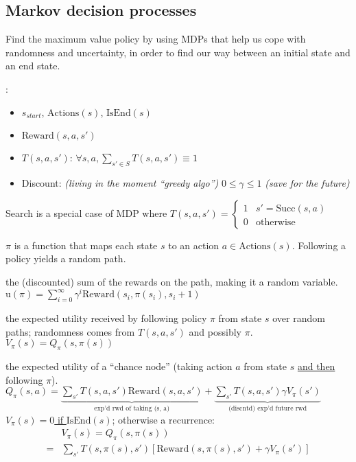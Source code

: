 \subsection{Markov decision processes}

Find the maximum value policy by using MDPs that help us cope with randomness
and uncertainty, in order to find our way between an initial state and an end
state.

:
\begin{itemize}
    \item $s_{start}$, $\text{Actions}(s)$, $\text{IsEnd}(s)$
    \item $\text{Reward}(s,a,s')$
    \item $T(s,a,s')$: $\forall s,a, \sum_{s'\in S} T(s,a,s') \equiv 1$
    \item Discount: \emph{(living in the moment ``greedy algo'')} $0 \le \gamma \le 1$ \emph{(save for the future)}
\end{itemize}
Search is a special case of MDP where $T(s,a,s') = \begin{cases}
    1 & s' = \text{Succ}(s,a) \\
    0 & \text{otherwise}
\end{cases}$

 $\pi$ is a function that maps each state $s$ to an action $a \in
\text{Actions}(s)$. Following a policy yields a random path.

 the (discounted) sum of the rewards on the
path, making it a random variable.
$\text{u}(\pi) = \sum_{i=0}^{\infty} \gamma^i \text{Reward}(s_i, \pi(s_i), s_i + 1)$

 the expected utility received by
following policy $\pi$ from state $s$ over random paths; randomness comes from
$T(s,a,s')$ and possibly $\pi$. $V_\pi(s) = Q_\pi(s,\pi(s))$

 the expected utility of a ``chance node'' (taking action $a$ from
state $s$ \underline{and then} following $\pi$).
$Q_\pi(s,a)
= \underbrace{\sum_{s'}T(s,a,s') \text{Reward}(s,a,s')}_{\text{exp'd rwd of taking (s, a)}}
+ \underbrace{\sum_{s'}T(s,a,s') \gamma V_\pi(s')}_{\text{(discntd) exp'd future rwd}}$
\underline{$V_\pi(s) = 0$ if $\text{IsEnd}(s)$};
otherwise a recurrence:
\begin{displaymath}
\boxed{
\begin{aligned}
    &V_\pi(s) = Q_\pi(s,\pi(s)) \\
    =&\sum_{s'}T(s,\pi(s),s')\left[\text{Reward}(s,\pi(s),s') + \gamma V_\pi(s')\right]
\end{aligned}
}
\end{displaymath}


